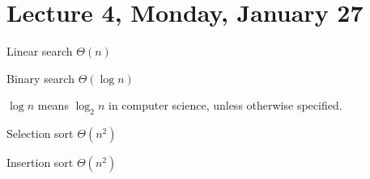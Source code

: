 \section{Lecture 4, Monday, January 27}

Linear search $\Theta(n)$

Binary search $\Theta(\log n)$

\begin{remark}
$\log n$ means $\log_2 n$ in computer science, unless otherwise specified.
\end{remark}

Selection sort $\Theta(n^2)$

Insertion sort $\Theta(n^2)$

